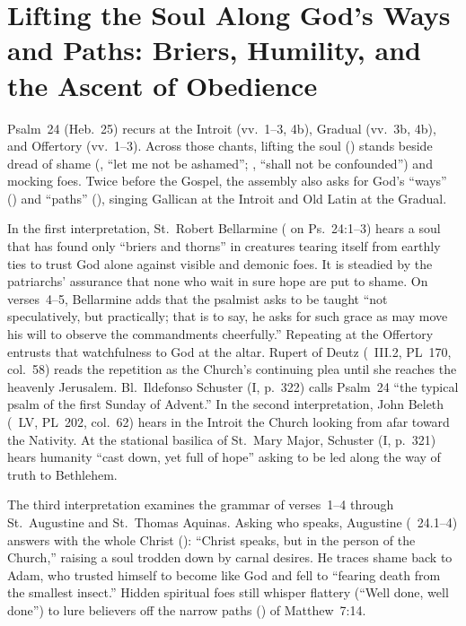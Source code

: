 \section{Lifting the Soul Along God's Ways and Paths: Briers, Humility, and the Ascent of Obedience}

Psalm~24 (Heb.~25) recurs at the Introit (vv.~1--3, 4b), Gradual (vv.~3b, 4b), and Offertory (vv.~1--3). Across those chants, lifting the soul () stands beside dread of shame (, ``let me not be ashamed''; , ``shall not be confounded'') and mocking foes. Twice before the Gospel, the assembly also asks for God's ``ways'' () and ``paths'' (), singing Gallican  at the Introit and Old Latin  at the Gradual.

In the first interpretation, St.~Robert Bellarmine ( on Ps.~24:1--3) hears a soul that has found only ``briers and thorns'' in creatures tearing itself from earthly ties to trust God alone against visible and demonic foes. It is steadied by the patriarchs' assurance that none who wait in sure hope are put to shame. On verses~4--5, Bellarmine adds that the psalmist asks to be taught ``not speculatively, but practically; that is to say, he asks for such grace as may move his will to observe the commandments cheerfully.'' Repeating  at the Offertory entrusts that watchfulness to God at the altar. Rupert of Deutz (~III.2, PL~170, col.~58) reads the repetition as the Church's continuing plea until she reaches the heavenly Jerusalem. Bl.~Ildefonso Schuster (I, p.~322) calls Psalm~24 ``the typical psalm of the first Sunday of Advent.'' In the second interpretation, John Beleth (~LV, PL~202, col.~62) hears in the Introit the Church looking from afar toward the Nativity. At the stational basilica of St.~Mary Major, Schuster (I, p.~321) hears humanity ``cast down, yet full of hope'' asking to be led along the way of truth to Bethlehem.

The third interpretation examines the grammar of verses~1--4 through St.~Augustine and St.~Thomas Aquinas. Asking who speaks, Augustine (~24.1--4) answers with the whole Christ (): ``Christ speaks, but in the person of the Church,'' raising a soul trodden down by carnal desires. He traces shame back to Adam, who trusted himself to become like God and fell to ``fearing death from the smallest insect.'' Hidden spiritual foes still whisper flattery (``Well done, well done'') to lure believers off the narrow paths () of Matthew~7:14.

